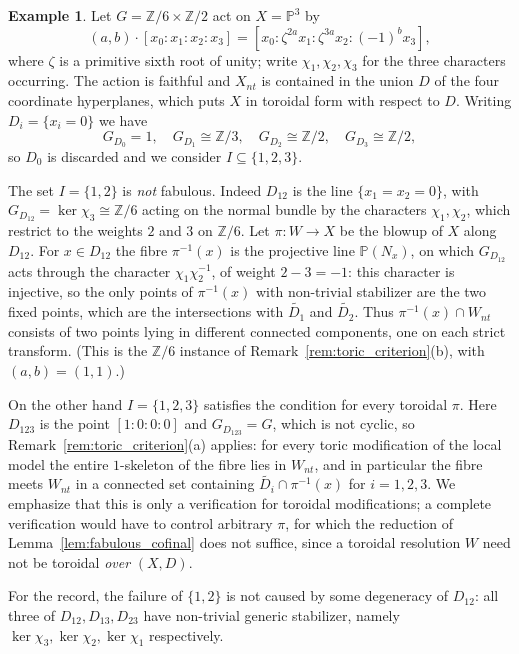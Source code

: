 \documentclass[11pt]{amsart}
\theoremstyle{plain}
\theoremstyle{definition}
\newtheorem{example}[theorem]{Example}
\theoremstyle{remark}
\numberwithin{equation}{section}
\begin{document}
\begin{example} \label{ex:not_a_complex}
Let $G = \mathbb{Z}/6 \times \mathbb{Z}/2$ act on $X = \mathbb{P}^3$ by
\[
(a,b) \cdot [x_0 : x_1 : x_2 : x_3]
= [x_0 : \zeta^{2a} x_1 : \zeta^{3a} x_2 : (-1)^b x_3] ,
\]
where $\zeta$ is a primitive sixth root of unity; write $\chi_1, \chi_2,
\chi_3$ for the three characters occurring.  The action is faithful and
$X_{nt}$ is contained in the union $D$ of the four coordinate hyperplanes,
which puts $X$ in toroidal form with respect to $D$.  Writing
$D_i = \{x_i = 0\}$ we have
\[
G_{D_0} = 1, \quad
G_{D_1} \cong \mathbb{Z}/3, \quad
G_{D_2} \cong \mathbb{Z}/2, \quad
G_{D_3} \cong \mathbb{Z}/2 ,
\]
so $D_0$ is discarded and we consider $I \subseteq \{1,2,3\}$.

The set $I = \{1,2\}$ is \emph{not} fabulous.  Indeed $D_{12}$ is the line
$\{x_1 = x_2 = 0\}$, with $G_{D_{12}} = \ker \chi_3 \cong \mathbb{Z}/6$
acting on the normal bundle by the characters $\chi_1, \chi_2$, which
restrict to the weights $2$ and $3$ on $\mathbb{Z}/6$.  Let $\pi : W \to X$
be the blowup of $X$ along $D_{12}$.  For $x \in D_{12}$ the fibre
$\pi^{-1}(x)$ is the projective line $\mathbb{P}(N_x)$, on which
$G_{D_{12}}$ acts through the character $\chi_1 \chi_2^{-1}$, of weight
$2 - 3 = -1$: this character is injective, so the only points of
$\pi^{-1}(x)$ with non-trivial stabilizer are the two fixed points, which
are the intersections with $\widetilde{D_1}$ and $\widetilde{D_2}$.  Thus
$\pi^{-1}(x) \cap W_{nt}$ consists of two points lying in different
connected components, one on each strict transform.  (This is the
$\mathbb{Z}/6$ instance of Remark~\ref{rem:toric_criterion}(b), with
$(a,b) = (1,1)$.)

On the other hand $I = \{1,2,3\}$ satisfies the condition for every
toroidal $\pi$.  Here $D_{123}$ is the point $[1:0:0:0]$ and
$G_{D_{123}} = G$, which is not cyclic, so
Remark~\ref{rem:toric_criterion}(a) applies: for every toric modification
of the local model the entire $1$-skeleton of the fibre lies in $W_{nt}$,
and in particular the fibre meets $W_{nt}$ in a connected set containing
$\widetilde{D_i} \cap \pi^{-1}(x)$ for $i = 1,2,3$.  We emphasize that this
is only a verification for toroidal modifications; a complete verification
would have to control arbitrary $\pi$, for which the reduction of
Lemma~\ref{lem:fabulous_cofinal} does not suffice, since a toroidal
resolution $W$ need not be toroidal \emph{over} $(X,D)$.

For the record, the failure of $\{1,2\}$ is not caused by some degeneracy of
$D_{12}$: all three of $D_{12}, D_{13}, D_{23}$ have non-trivial generic
stabilizer, namely $\ker\chi_3, \ker\chi_2, \ker\chi_1$ respectively.
\end{example}
\end{document}
